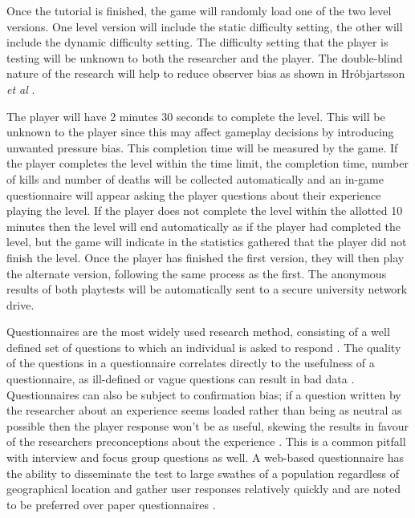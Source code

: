 \documentclass[journal]{IEEEtran}
\begin{document}
Once the tutorial is finished, the game will randomly load one of the two level versions. One level version will include the static difficulty setting, the other will include the dynamic difficulty setting. The difficulty setting that the player is testing will be unknown to both the researcher and the player. The double-blind nature of the research will help to reduce observer bias as shown in Hróbjartsson \textit{et al} \cite{hrobjartsson2013observer}. 

The player will have 2 minutes 30 seconds to complete the level. This will be unknown to the player since this may affect gameplay decisions by introducing unwanted pressure bias. This completion time will be measured by the game. If the player completes the level within the time limit, the completion time, number of kills and number of deaths will be collected automatically and an in-game questionnaire will appear asking the player questions about their experience playing the level. If the player does not complete the level within the allotted 10 minutes then the level will end automatically as if the player had completed the level, but the game will indicate in the statistics gathered that the player did not finish the level. Once the player has finished the first version, they will then play the alternate version, following the same process as the first. The anonymous results of both playtests will be automatically sent to a secure university network drive.



Questionnaires are the most widely used research method, consisting of a well defined set of questions to which an individual is asked to respond \cite{goddard2006designing}. The quality of the questions in a questionnaire correlates directly to the usefulness of a questionnaire, as ill-defined or vague questions can result in bad data \cite{litwin1995measure}. Questionnaires can also be subject to confirmation bias; if a question written by the researcher about an experience seems loaded rather than being as neutral as possible then the player response won't be as useful, skewing the results in favour of the researchers preconceptions about the experience \cite{fowler1995improving}. This is a common pitfall with interview and focus group questions as well. A web-based questionnaire has the ability to disseminate the test to large swathes of a population regardless of geographical location and gather user responses relatively quickly and are noted to be preferred over paper questionnaires \cite{evans2005value}.
\end{document}
